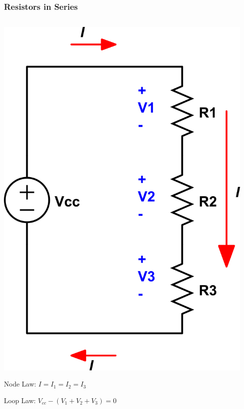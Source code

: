 \documentclass{beamer}
\begin{document}
\begin{frame}\frametitle{Resistors in Series}
\begin{columns}
\begin{column}{5cm}
\begin{center}
\includegraphics[scale=0.25]{fig/series.png}

\vspace{0.5cm}

Node Law: $I = I_1 = I_2 = I_3$

\vspace{0.2cm}

Loop Law: $V_{cc} - (V_1 + V_2 + V_3) = 0$

\end{center}
\end{column}
\begin{column}{5cm}


\end{column}
\end{columns}
\end{frame}
\end{document}
